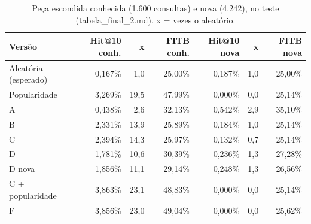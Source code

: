 \begin{table}[t]
\centering
\caption{Peça escondida conhecida (1.600 consultas) e nova (4.242), no teste (tabela\_final\_2.md). x = vezes o aleatório.}
\label{tab:conhecida_nova}
\footnotesize
\begin{tabular}{lrrrrrr}
\toprule
Versão & Hit@10 conh. & x & FITB conh. & Hit@10 nova & x & FITB nova \\
\midrule
Aleatória (esperado) & 0,167\% & 1,0 & 25,00\% & 0,187\% & 1,0 & 25,00\% \\
Popularidade & 3,269\% & 19,5 & 47,99\% & 0,000\% & 0,0 & 25,14\% \\
A & 0,438\% & 2,6 & 32,13\% & 0,542\% & 2,9 & 35,10\% \\
B & 2,331\% & 13,9 & 25,89\% & 0,184\% & 1,0 & 25,14\% \\
C & 2,394\% & 14,3 & 25,97\% & 0,132\% & 0,7 & 25,14\% \\
D & 1,781\% & 10,6 & 30,39\% & 0,236\% & 1,3 & 27,28\% \\
D nova & 1,856\% & 11,1 & 29,14\% & 0,248\% & 1,3 & 26,56\% \\
C + popularidade & 3,863\% & 23,1 & 48,83\% & 0,000\% & 0,0 & 25,14\% \\
F & 3,856\% & 23,0 & 49,04\% & 0,000\% & 0,0 & 25,62\% \\
\bottomrule
\end{tabular}
\end{table}
